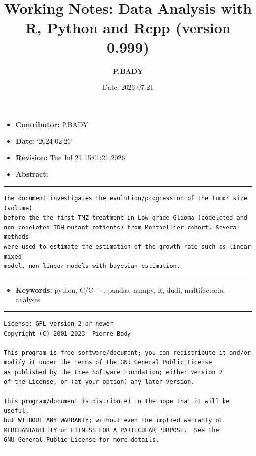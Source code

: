 \documentclass[
  10pt,
]{article}
\title{\textbf{Working Notes:} Data Analysis with R, Python and Rcpp
(version 0.999)}
\author{\textbf{P.BADY}}
\date{Date: 2026-07-21}
\providecommand{\tightlist}{%
  \setlength{\itemsep}{0pt}\setlength{\parskip}{0pt}}
\begin{document}
\maketitle

{
\setcounter{tocdepth}{5}
\tableofcontents
}
\newpage

\begin{itemize}
\tightlist
\item
  \textbf{Contributor:} P.BADY
\item
  \textbf{Date:} `2024-02-26'
\item
  \textbf{Revision:} Tue Jul 21 15:01:21 2026
\item
  \textbf{Abstract:}
\end{itemize}

\rule{1\linewidth}{0.5pt}

\begin{verbatim}
The document investigates the evolution/progression of the tumor size (volume) 
before the the first TMZ treatment in Low grade Glioma (codeleted and 
non-codeleted IDH mutant patients) from Montpellier cohort. Several methods 
were used to estimate the estimation of the growth rate such as linear mixed 
model, non-linear models with bayesian estimation.
\end{verbatim}

\rule{1\linewidth}{0.5pt}

\begin{itemize}
\tightlist
\item
  \textbf{Keywords:} python, C/C++, pandas, numpy, R, dudi,
  multifactorial analyses
\end{itemize}

\rule{1\linewidth}{0.5pt}

\begin{verbatim}
License: GPL version 2 or newer
Copyright (C) 2001-2023  Pierre Bady

This program is free software/document; you can redistribute it and/or
modify it under the terms of the GNU General Public License
as published by the Free Software Foundation; either version 2
of the License, or (at your option) any later version.

This program/document is distributed in the hope that it will be useful,
but WITHOUT ANY WARRANTY; without even the implied warranty of
MERCHANTABILITY or FITNESS FOR A PARTICULAR PURPOSE.  See the
GNU General Public License for more details.
\end{verbatim}

\rule{1\linewidth}{0.5pt}
\end{document}
